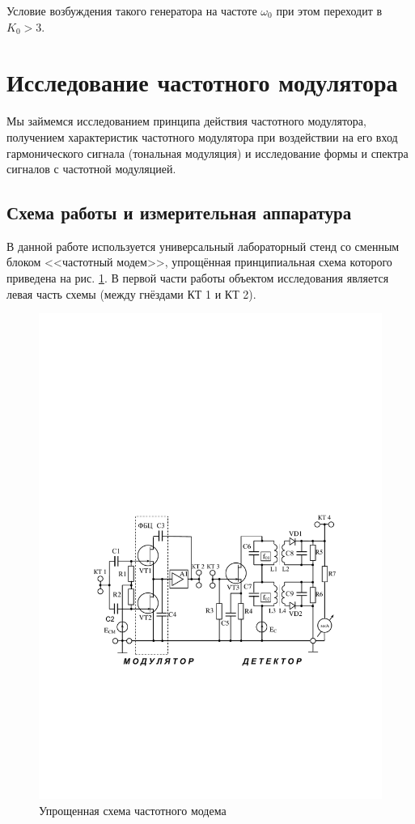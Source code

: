 Условие возбуждения такого генератора на частоте $\omega_0$ при этом переходит в $K_0 > 3$. 

\section{Исследование частотного модулятора}
Мы займемся исследованием принципа действия частотного модулятора, получением характеристик частотного модулятора при воздействии на его вход гармонического сигнала (тональная модуляция) и исследование формы и спектра сигналов с частотной модуляцией.

\subsection{Схема работы и измерительная аппаратура}
В данной работе используется универсальный лабораторный стенд со сменным блоком <<частотный модем>>, упрощённая принципиальная схема которого приведена на рис. \ref{fig:6.1}. В первой части работы объектом исследования является левая часть схемы (между гнёздами КТ 1 и КТ 2).
\begin{figure}[H]
	\centering
	\includegraphics[scale=1]{fig/fig6-1}
	\caption{Упрощенная схема частотного модема}
	\label{fig:6.1}
\end{figure}

